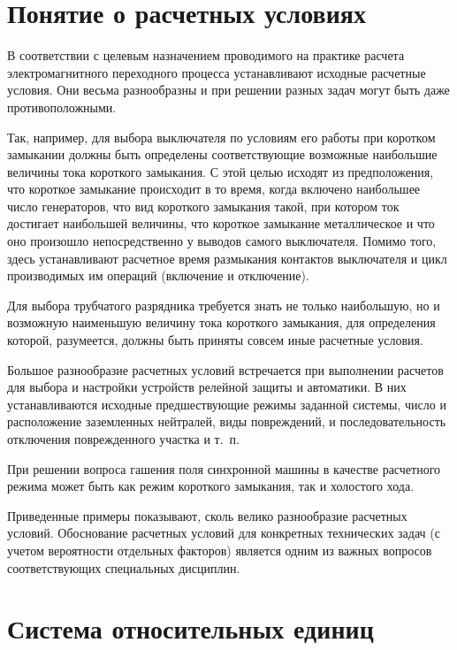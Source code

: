 \section{Понятие о расчетных условиях}
\label{sec:2-2 poniatie o raschetnykh usloviiakh}

В соответствии с целевым назначением проводимого на практике расчета электромагнитного переходного процесса устанавливают исходные расчетные условия. Они весьма разнообразны и при решении разных задач могут быть даже противоположными.

Так, например, для выбора выключателя по условиям его работы при коротком замыкании должны быть определены соответствующие возможные наибольшие величины тока короткого замыкания. С этой целью исходят из предположения, что короткое замыкание происходит в то время, когда включено наибольшее число генераторов, что вид короткого замыкания такой, при котором ток достигает наибольшей величины, что короткое замыкание металлическое и что оно произошло непосредственно у выводов самого выключателя. Помимо того, здесь устанавливают расчетное время размыкания контактов выключателя и цикл производимых им операций (включение и отключение).

Для выбора трубчатого разрядника требуется знать не только наибольшую, но и возможную наименьшую величину тока короткого замыкания, для определения которой, разумеется, должны быть приняты совсем иные расчетные условия.

Большое разнообразие расчетных условий встречается при выполнении расчетов для выбора и настройки устройств релейной защиты и автоматики. В них устанавливаются исходные предшествующие режимы заданной системы, число и расположение заземленных нейтралей, виды повреждений, и последовательность отключения поврежденного участка и т.~п.

При решении вопроса гашения поля синхронной машины в качестве расчетного режима может быть как режим короткого замыкания, так и холостого хода.

Приведенные примеры показывают, сколь велико разнообразие расчетных условий. Обоснование расчетных условий для конкретных технических задач (с учетом вероятности отдельных факторов) является одним из важных вопросов соответствующих специальных дисциплин.

\section{Система относительных единиц}
\label{sec:2-3 sistema otnositelnykh edinitc}

